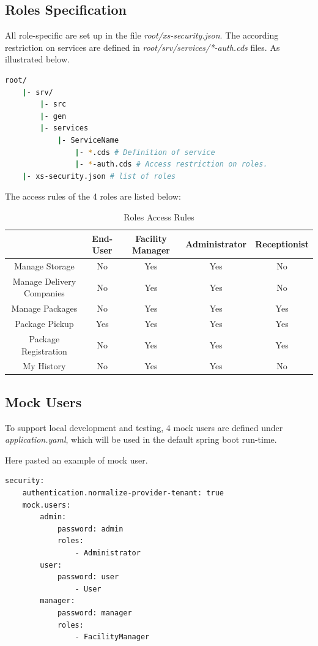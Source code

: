 \subsection{Roles Specification}
All role-specific are set up in the file \textit{root/xs-security.json}. The according restriction on services are defined in \textit{root/srv/services/*-auth.cds} files. As illustrated below.

\begin{lstlisting}[language={bash}]
root/
    |- srv/
        |- src
        |- gen
        |- services
            |- ServiceName 
                |- *.cds # Definition of service
                |- *-auth.cds # Access restriction on roles.
    |- xs-security.json # list of roles
\end{lstlisting}

The access rules of the 4 roles are listed below:

\begin{table}[H]
    \centering
    \begin{tabular}{|c|c|c|c|c|} \hline 
         &  End-User&  Facility Manager&  Administrator&  Receptionist \\ \hline 
         Manage Storage& No  & Yes & Yes & No  \\ \hline 
         Manage Delivery Companies& No & Yes & Yes & No  \\ \hline 
         Manage Packages& No & Yes & Yes & Yes \\ \hline 
         Package Pickup& Yes & Yes & Yes & Yes  \\ \hline 
         Package Registration& No & Yes & Yes & Yes \\ \hline 
         My History& No & Yes & Yes & No \\ \hline
    \end{tabular}
    \caption{Roles Access Rules}
    \label{tab:Access Rule}
\end{table}

\subsection{Mock Users}
To support local development and testing, 4 mock users are defined under \textit{application.yaml}, which will be used in the default spring boot run-time.

Here pasted an example of mock user.

\begin{lstlisting}[language={bash}]
security:
    authentication.normalize-provider-tenant: true
    mock.users:
        admin:
            password: admin
            roles:  
                - Administrator 
        user:
            password: user
                - User
        manager:
            password: manager
            roles:
                - FacilityManager
\end{lstlisting}

